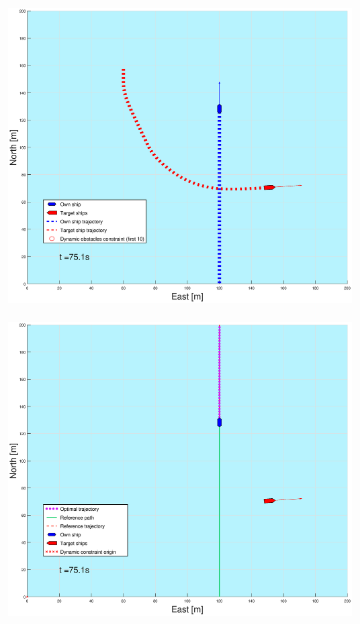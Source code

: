 \begin{figure}[ht]\ContinuedFloat
    \begin{subfigure}[b]{0.49\textwidth}
        \centering
        \includegraphics[width=\textwidth]{Images/Figures/sving_SO/_Simple_0fig1_time=75}
    \end{subfigure}
    \hfill
    \begin{subfigure}[b]{0.499\textwidth}
        \centering
        \includegraphics[width=\textwidth]{Images/Figures/sving_SO/_Simple_0fig999_time=75}

\end{subfigure}
\end{figure}
